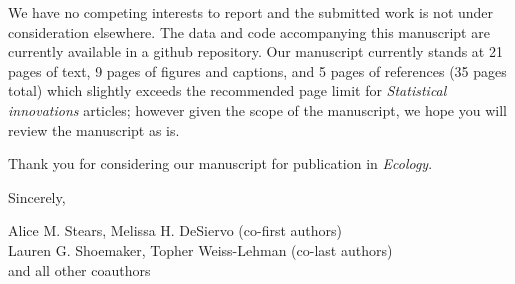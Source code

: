 \documentclass{article}
\begin{document}
\vspace{-0.75em}

We have no competing interests to report and the submitted work is not under consideration elsewhere. The data and code accompanying this manuscript are currently available in a github repository. Our manuscript currently stands at 21 pages of text, 9 pages of figures and captions, and 5 pages of references (35 pages total) which slightly exceeds the recommended page limit for \textit{Statistical innovations} articles; however given the scope of the manuscript, we hope you will review the manuscript as is. 

Thank you for considering our manuscript for publication in \textit{Ecology}.

\mediumskip %

Sincerely,

Alice M. Stears,  Melissa H. DeSiervo (co-first authors) \\
Lauren G. Shoemaker, Topher Weiss-Lehman (co-last authors) \\
and all other coauthors


\vspace{25pt} %
\end{document}
